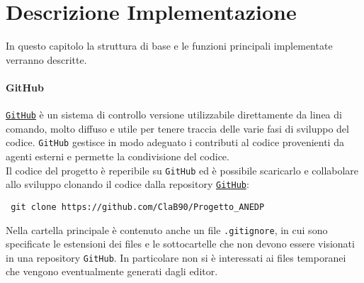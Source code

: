 \chapter{Descrizione Implementazione}
\label{chap:Code}

In questo capitolo la struttura di base e le funzioni principali implementate verranno descritte.

\subsubsection{GitHub} 
\href{https://github.com/}{\texttt{GitHub}} è un sistema di controllo versione utilizzabile direttamente da linea di comando, molto diffuso e utile per tenere traccia delle varie fasi di sviluppo del codice. \texttt{GitHub} gestisce in modo adeguato i contributi al codice provenienti da agenti esterni e permette la condivisione del codice.\\
Il codice del progetto è reperibile su \texttt{GitHub} ed è possibile scaricarlo e collabolare allo sviluppo clonando il codice dalla repository  \href{https://github.com/}{\texttt{GitHub}}:\\
\begin{center}
\texttt{ git clone https://github.com/ClaB90/Progetto\_ANEDP}
\end{center}
Nella cartella principale è contenuto anche un file \texttt{.gitignore}, in cui sono specificate le estensioni dei files e le sottocartelle che non devono essere visionati in una repository \texttt{GitHub}. In particolare non si è interessati ai files temporanei che vengono eventualmente generati dagli editor.